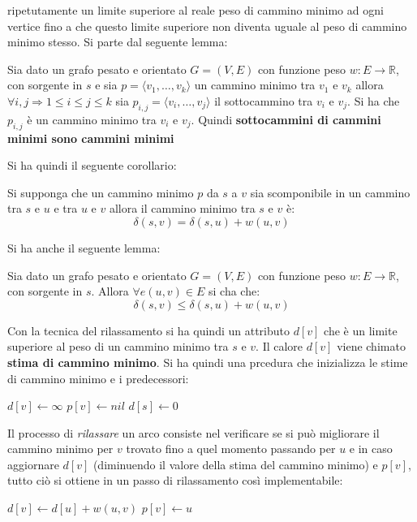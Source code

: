 \documentclass[a4paper,12pt, oneside]{book}
\begin{document}
ripetutamente un limite superiore al reale peso di cammino minimo ad
ogni vertice fino a che questo limite superiore non diventa uguale al
peso di cammino minimo stesso. Si parte dal seguente lemma:
\begin{lemma}
  Sia dato un grafo pesato e orientato $G=(V,E)$ con funzione peso
  $w:E\to \mathbb{R}$, con sorgente in $s$ e sia $p=\langle v_1,\ldots,v_k\rangle$  un
  cammino minimo tra $v_1$ e $v_k$ allora $\forall i,j\Longrightarrow
  1\leq i\leq j\leq k$ sia $p_{i,j}=\langle v_i,\ldots,v_j\rangle$ il
  sottocammino tra $v_i$ e $v_j$. Si ha che $p_{i,j}$ è un cammino
  minimo tra  $v_i$ e $v_j$. Quindi \textbf{sottocammini di cammini
    minimi sono cammini minimi}
\end{lemma}
Si ha quindi il seguente corollario:
\begin{corollario}
  Si supponga che un cammino minimo $p$ da $s$ a $v$ sia scomponibile
  in un cammino tra $s$ e $u$ e tra $u$ e $v$ allora il cammino minimo
  tra $s$ e $v$ è:
  \[\delta(s,v)=\delta(s,u)+w(u,v)\]
\end{corollario}
Si ha anche il seguente lemma:
\begin{lemma}
  Sia dato un grafo pesato e orientato $G=(V,E)$ con funzione peso
  $w:E\to \mathbb{R}$, con sorgente in $s$. Allora $\forall e(u,v)\in
  E$ si cha che:
  \[\delta(s,v)\leq \delta(s,u)+w(u,v)\]
\end{lemma}
Con la tecnica del rilassamento si ha quindi un attributo $d[v]$ che è
un limite superiore al peso di un cammino minimo tra $s$ e $v$. Il
calore $d[v]$ viene chimato \textbf{stima di cammino minimo}. Si ha
quindi una prcedura che inizializza le stime di cammino minimo e i
predecessori:
\begin{algorithm}[H]
  \begin{algorithmic}
    \State $d[v]\gets \infty$
    \State $p[v]\gets nil$
    \EndFor
    \State $d[s]\gets 0$
    \EndFunction
  \end{algorithmic}
\end{algorithm}
Il processo di \textit{rilassare} un arco consiste nel verificare se
si può migliorare il cammino minimo per $v$ trovato fino a quel
momento passando per $u$ e in caso aggiornare $d[v]$ (diminuendo il
valore della stima del cammino minimo) e $p[v]$, tutto ciò si ottiene
in un passo di rilassamento così implementabile:
\begin{algorithm}[H]
  \begin{algorithmic}
    \State $d[v]\gets d[u]+w(u,v)$
    \State $p[v]\gets u$
    \EndIf
    \EndFunction
  \end{algorithmic}
\end{algorithm}
\end{document}
